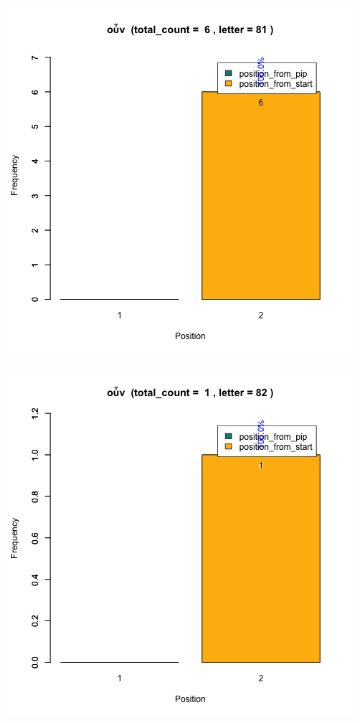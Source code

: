 \documentclass[a4paper]{article}
\begin{document}
\begin{figure}
\begin{subfigure}{0.45\textwidth}
\centering
\includegraphics[width=1\linewidth]{../../data/output/peter_R_par/plots/par5_lt81.png}
\end{subfigure}
\begin{subfigure}{0.45\textwidth}
\centering
\includegraphics[width=1\linewidth]{../../data/output/peter_R_par/plots/par5_lt82.png}
\end{subfigure}
\end{figure}
\end{document}
